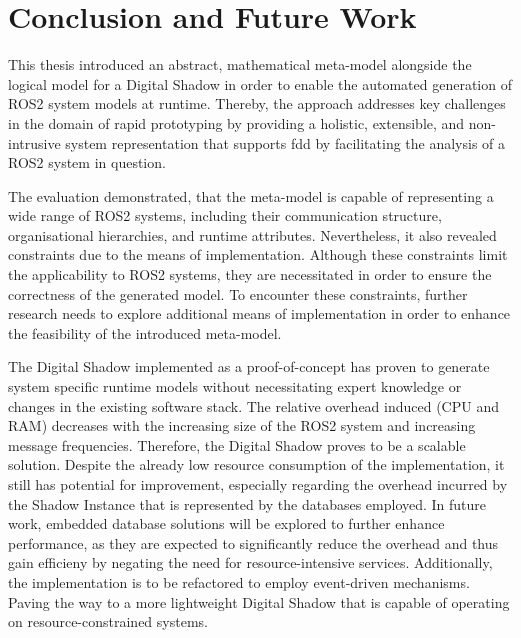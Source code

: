 \chapter{Conclusion and Future Work} \label{chap:futurework}

This thesis introduced an abstract, mathematical meta-model alongside the logical model for a Digital Shadow in order to enable the automated generation of ROS2 system models at runtime. Thereby, the approach addresses key challenges in the domain of rapid prototyping by providing a holistic, extensible, and non-intrusive system representation that supports \acl{fdd} by facilitating the analysis of a ROS2 system in question.

The evaluation demonstrated, that the meta-model is capable of representing a wide range of ROS2 systems, including their communication structure, organisational hierarchies, and runtime attributes. Nevertheless, it also revealed constraints due to the means of implementation. Although these constraints limit the applicability to ROS2 systems, they are necessitated in order to ensure the correctness of the generated model. To encounter these constraints, further research needs to explore additional means of implementation in order to enhance the feasibility of the introduced meta-model. 

The Digital Shadow implemented as a proof-of-concept has proven to generate system specific runtime models without necessitating expert knowledge or changes in the existing software stack. The relative overhead induced (CPU and RAM) decreases with the increasing size of the ROS2 system and increasing message frequencies. Therefore, the Digital Shadow proves to be a scalable solution.
Despite the already low resource consumption of the implementation, it still has potential for improvement, especially regarding the overhead incurred by the Shadow Instance that is represented by the databases employed. In future work, embedded database solutions will be explored to further enhance performance, as they are expected to significantly reduce the overhead and thus gain efficieny by negating the need for resource-intensive services.
Additionally, the implementation is to be refactored to employ event-driven mechanisms. Paving the way to a more lightweight Digital Shadow that is capable of operating on resource-constrained systems.


